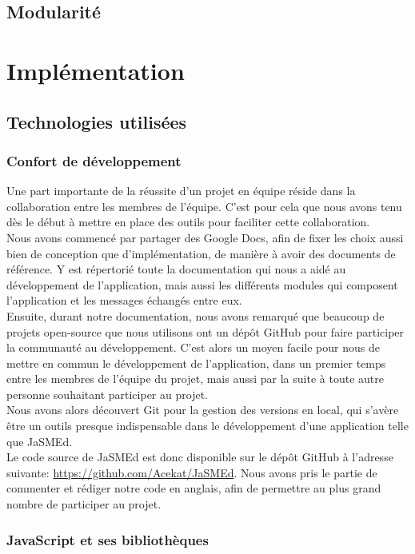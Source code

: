 \documentclass[12pt,a4paper]{article}
\begin{document}
\subsection{Modularité}


\section{Implémentation}

\subsection{Technologies utilisées}

\subsubsection{Confort de développement}

Une part importante de la réussite d’un projet en équipe réside dans la collaboration entre les membres de l’équipe. C’est pour cela que nous avons tenu dès le début à mettre en place des outils pour faciliter cette collaboration.\\
Nous avons commencé par partager des Google Docs, afin de fixer les choix aussi bien de conception que d’implémentation, de manière à avoir des documents de référence. Y est répertorié toute la documentation qui nous a aidé au développement de l’application, mais aussi les différents modules qui composent l’application et les messages échangés entre eux.\\
Ensuite, durant notre documentation, nous avons remarqué que beaucoup de projets open-source que nous utilisons ont un dépôt GitHub pour faire participer la communauté au développement. C’est alors un moyen facile pour nous de mettre en commun le développement de l’application, dans un premier temps entre les membres de l’équipe du projet, mais aussi par la suite à toute autre personne souhaitant participer au projet.\\
Nous avons alors découvert Git pour la gestion des versions en local, qui s’avère être un outils presque indispensable dans le développement d’une application telle que JaSMEd.\\
Le code source de JaSMEd est donc disponible sur le dépôt GitHub à l’adresse suivante: \url{https://github.com/Acekat/JaSMEd}. Nous avons pris le partie de commenter et rédiger notre code en anglais, afin de permettre au plus grand nombre de participer au projet.

\subsubsection{JavaScript et ses bibliothèques}
\end{document}
